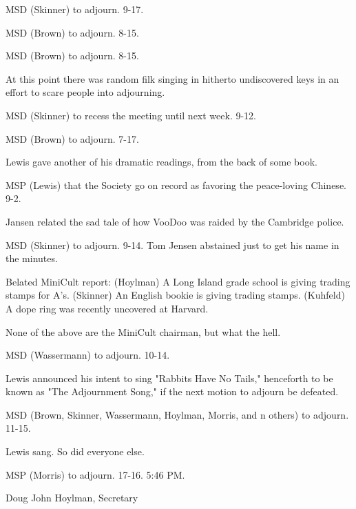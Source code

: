 \documentclass[12pt]{article}
\begin{document}
MSD (Skinner) to adjourn. 9-17.

MSD (Brown) to adjourn. 8-15.

MSD (Brown) to adjourn. 8-15.

At this point there was random filk singing in hitherto undiscovered keys in an effort to scare people into adjourning.

MSD (Skinner) to recess the meeting until next week. 9-12.

MSD (Brown) to adjourn. 7-17.

Lewis gave another of his dramatic readings, from the back of some book.

MSP (Lewis) that the Society go on record as favoring the peace-loving Chinese. 9-2.

Jansen related the sad tale of how VooDoo was raided by the Cambridge police.

MSD (Skinner) to adjourn. 9-14. Tom Jensen abstained just to get his name in the minutes.

Belated MiniCult report: (Hoylman) A Long Island grade school is giving trading stamps for A's. (Skinner) An English bookie is giving trading stamps. (Kuhfeld) A dope ring was recently uncovered at Harvard.

None of the above are the MiniCult chairman, but what the hell.

MSD (Wassermann) to adjourn. 10-14.

Lewis announced his intent to sing "Rabbits Have No Tails," henceforth to be known as "The Adjournment Song," if the next motion to adjourn be defeated.

MSD (Brown, Skinner, Wassermann, Hoylman, Morris, and n others) to adjourn. 11-15.

Lewis sang. So did everyone else.

MSP (Morris) to adjourn. 17-16. 5:46 PM.

\vspace{12pt}

\centerline{Doug John Hoylman, Secretary}
\end{document}

